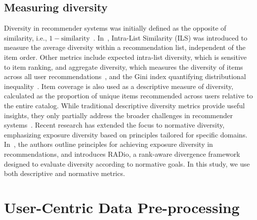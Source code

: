 \documentclass[runningheads]{llncs}
\begin{document}
\subsection{Measuring diversity}
Diversity in recommender systems was initially defined as the opposite of similarity, i.e., \( 1 - \text{similarity} \)~\cite{Smyth2001Similarity}. 
In~\cite{Ziegler2005Improving}, Intra-List Similarity (ILS) was introduced to measure the average diversity within a recommendation list, independent of the item order. 
Other metrics include expected intra-list diversity, which is sensitive to item ranking, and aggregate diversity, which measures the diversity of items across all user recommendations~\cite{Vargas2011Rank}, and the Gini index quantifying distributional inequality~\cite{Daniel2009Blockbuster}. 
Item coverage is also used as a descriptive measure of diversity, calculated as the proportion of unique items recommended across users relative to the entire catalog.
While traditional descriptive diversity metrics provide useful insights, they only partially address the broader challenges in recommender systems~\cite{Treuillier2022Being}. 
Recent research has extended the focus to normative diversity, emphasizing exposure diversity based on principles tailored for specific domains. 
In~\cite{Helberger2018Exposure}, the authors outline principles for achieving exposure diversity in recommendations, and \cite{Vrijenhoek2022RADio} introduces RADio, a rank-aware divergence framework designed to evaluate diversity according to normative goals.
In this study, we use both descriptive and normative metrics.  


\section{User-Centric Data Pre-processing}
\label{sec:method}
\end{document}
